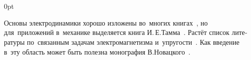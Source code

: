 \section*{\small \wordforbibliography}

\begin{changemargin}{\parindent}{0pt}
\fontsize{10}{12}\selectfont

\begin{otherlanguage}{russian}

Основы электродинамики хорошо изложены во~многих книгах~\cite{classicalelectrodynamics, feynman-lecturesonphysics}, но для~приложений в~механике выделяется книга И.\,Е.\;Тамма~\cite{tamm-electricity}.
Растёт список литературы по~связанным задачам электромагнетизма и~упругости~\cite{parton-electromagneticelasticity, podstrigach.burak.kondrat-magnetothermoelasticity}.
Как введение в~эту область может быть полезна монография В.\;Новацкого~\cite{nowacki-electromagneticeffects}.

\end{otherlanguage}

\end{changemargin}

